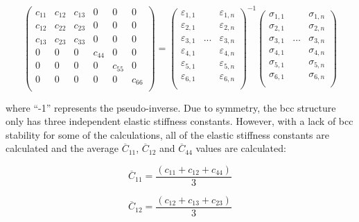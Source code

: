 \begin{equation}
\label{eq: hookes}
\begin{pmatrix}
	c_{11} & c_{12} & c_{13} & 0 & 0 & 0\\
	c_{12} & c_{22} & c_{23} & 0 & 0 & 0\\
	c_{13} & c_{23} & c_{33} & 0 & 0 & 0\\
	0 & 0 & 0 & c_{44} & 0 & 0\\
	0 & 0 & 0 & 0 &  c_{55} & 0\\
	0 & 0 & 0 & 0 & 0 & c_{66} \\    		
\end{pmatrix} =
\begin{pmatrix}
	\varepsilon_{1,1} & & \varepsilon_{1,n}\\
	\varepsilon_{2,1} & & \varepsilon_{2,n}\\
	\varepsilon_{3,1} & ... & \varepsilon_{3,n}\\
	\varepsilon_{4,1} & & \varepsilon_{4,n}\\
	\varepsilon_{5,1} & & \varepsilon_{5,n}\\
	\varepsilon_{6,1} & & \varepsilon_{6,n}\\					
\end{pmatrix}^{-1}
\begin{pmatrix}
	\sigma_{1,1} & & \sigma_{1,n}\\
	\sigma_{2,1} & & \sigma_{2,n}\\
	\sigma_{3,1} & ... & \sigma_{3,n}\\
	\sigma_{4,1} & & \sigma_{4,n}\\
	\sigma_{5,1} & & \sigma_{5,n}\\
	\sigma_{6,1} & & \sigma_{6,n}\\					
\end{pmatrix}
\end{equation}

where “-1” represents the pseudo-inverse. Due to symmetry, the bcc structure only has three independent elastic stiffness constants. However, with a lack of bcc stability for some of the calculations, all of the elastic stiffness constants are calculated and the average $\overline{C}_{11}$, $\overline{C}_{12}$ and $\overline{C}_{44}$ values are calculated:

\begin{equation}
\label{eq: averagec11}
\overline{C}_{11} = \frac{(c_{11} + c_{12} + c_{44})}{3}
\end{equation}

\begin{equation}
\label{eq: averagec12}
\overline{C}_{12} = \frac{(c_{12} + c_{13} + c_{23})}{3}
\end{equation}

